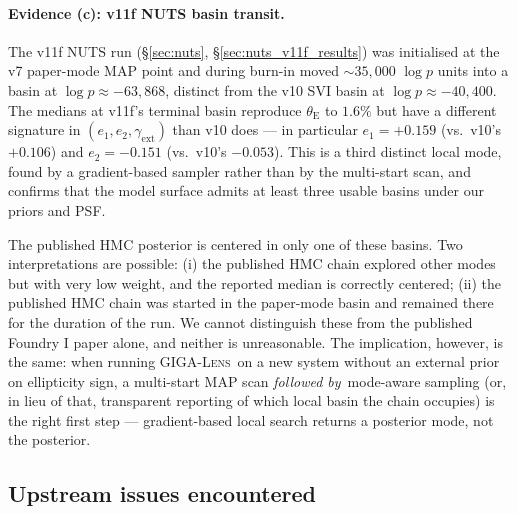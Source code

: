 \documentclass[11pt,letterpaper]{article}
\newcommand{\thetaE}{\ensuremath{\theta_{\mathrm{E}}}}
\newcommand{\gext}{\ensuremath{\gamma_{\mathrm{ext}}}}
\newcommand{\eone}{\ensuremath{e_{1}}}
\newcommand{\etwo}{\ensuremath{e_{2}}}
\newcommand{\gigalens}{\textsc{GIGA-Lens}}
\begin{document}
\paragraph{Evidence (c): v11f NUTS basin transit.} The v11f NUTS run
(\S\ref{sec:nuts}, \S\ref{sec:nuts_v11f_results}) was initialised at
the v7 paper-mode MAP point and during burn-in moved $\sim 35{,}000$
$\log p$ units into a basin at $\log p\approx -63{,}868$, distinct
from the v10 SVI basin at $\log p\approx -40{,}400$. The medians
at v11f's terminal basin reproduce $\thetaE$ to $1.6\%$ but have a
different signature in $(\eone,\etwo,\gext)$ than v10 does --- in
particular $\eone=+0.159$ (vs.\ v10's $+0.106$) and $\etwo=-0.151$
(vs.\ v10's $-0.053$). This is a third distinct local mode, found
by a gradient-based sampler rather than by the multi-start scan, and
confirms that the model surface admits at least three usable basins
under our priors and PSF.

The published HMC posterior is centered in only one of these basins.
Two interpretations are possible: (i) the published HMC chain explored
other modes but with very low weight, and the reported median is
correctly centered; (ii) the published HMC chain was started in the
paper-mode basin and remained there for the duration of the run.
We cannot distinguish these from the published Foundry I paper alone,
and neither is unreasonable. The implication, however, is the same:
when running \gigalens\ on a new system without an external prior on
ellipticity sign, a multi-start MAP scan {\it followed by}\
mode-aware sampling (or, in lieu of that, transparent reporting of
which local basin the chain occupies) is the right first step ---
gradient-based local search returns a posterior mode, not the
posterior.

\subsection{Upstream issues encountered}
\label{sec:upstream}
\end{document}
